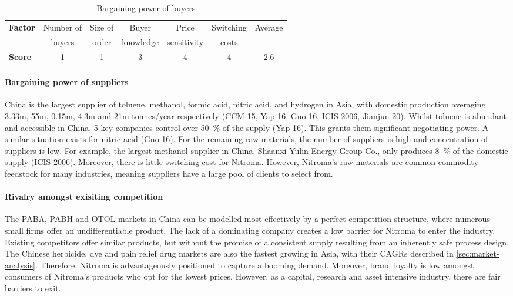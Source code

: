 \begin{table}[H]
\centering
\caption{Bargaining power of buyers}
\label{tab:substitute-products}
\begin{tabular}{lcccccc}
\toprule
\multirow{2}{*}{\textbf{Factor}} & Number of    & Size of   & Buyer          & Price          & Switching & Average  \\
                                 & buyers       & order     & knowledge      & sensitivity    & costs     &          \\\midrule
\textbf{Score}                   & 1            & 1         & 3              & 4              & 4         & 2.6       \\\bottomrule
\end{tabular}%
\end{table}

\paragraph{Bargaining power of suppliers}
China is the largest supplier of toluene, methanol, formic acid, nitric acid, and hydrogen in Asia, with domestic production averaging 3.33m, 55m, 0.15m, 4.3m and 21m tonnes/year respectively (CCM 15, Yap 16, Guo 16, ICIS 2006, Jianjun 20). Whilst toluene is abundant and accessible in China, 5 key companies control over \SI{50}{\percent} of the supply (Yap 16). This grants them significant negotiating power. A similar situation exists for nitric acid (Guo 16). For the remaining raw materials, the number of suppliers is high and concentration of suppliers is low. For example, the largest methanol supplier in China, Shaanxi Yulin Energy Group Co., only produces \SI{8}{\percent} of the domestic supply (ICIS 2006). Moreover, there is little switching cost for Nitroma. However, Nitroma’s raw materials are common commodity feedstock for many industries, meaning suppliers have a large pool of clients to select from.

\paragraph{Rivalry amongst exisiting competition}
The PABA, PABH and OTOL markets in China can be modelled most effectively by a perfect competition structure, where numerous small firms offer an undifferentiable product. The lack of a dominating company creates a low barrier for Nitroma to enter the industry. Existing competitors offer similar products, but without the promise of a consistent supply resulting from an inherently safe process design. The Chinese herbicide, dye and pain relief drug markets are also the fastest growing in Asia, with their CAGRs described in \ref{sec:market-analysis}. Therefore, Nitroma is advantageously positioned to capture a booming demand. Moreover, brand loyalty is low amongst consumers of Nitroma’s products who opt for the lowest prices. However, as a capital, research and asset intensive industry, there are fair barriers to exit. 
                                                        
